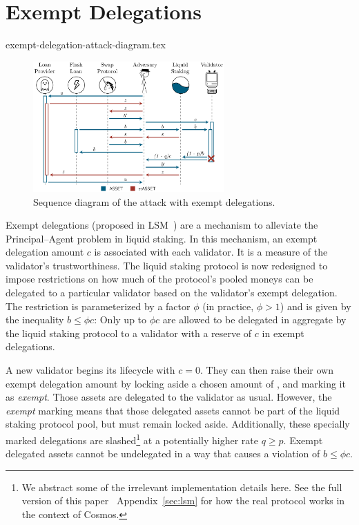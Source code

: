 \section{Exempt Delegations}

\ifccs
  \ifproceedings
  \else
    {exempt-delegation-attack-diagram.tex}
  \fi
\fi

\ifccs
  \begin{figure}[b]
    \centering
    \includegraphics[width=0.65\textwidth]{./figures/sequence-diagram.pdf}
    \caption{Sequence diagram of the attack with exempt delegations.}
    \label{fig:exempt-sequence}
  \end{figure}
\fi

Exempt delegations (proposed in LSM~\cite{liquidity-staking-module})
are a mechanism to alleviate the Principal--Agent problem in liquid staking.
In this mechanism, an exempt delegation amount $c$ \asset is associated
with each validator. It is a measure of the validator's trustworthiness.
The liquid staking protocol is now redesigned to impose restrictions
on how much of the protocol's pooled moneys can be delegated to a particular
validator based on the validator's exempt delegation.
The restriction is
parameterized by a factor $\phi$ (in practice, $\phi > 1$)
and is given by the inequality $b \leq \phi c$: Only up to $\phi c$ \assets
are allowed to be delegated in aggregate by the liquid staking protocol
to a validator with a reserve of $c$ \asset in exempt delegations.

A new validator begins its lifecycle with $c = 0$. They can then
raise their own exempt delegation amount by locking aside a
chosen amount of \asset, and marking it as \emph{exempt}. Those
assets are delegated to the validator as usual. However,
the \emph{exempt}
marking means that those delegated assets cannot be part of the liquid
staking protocol pool, but must remain locked aside. Additionally,
these specially marked delegations are slashed\footnote{We abstract some
of the irrelevant implementation details here. See
\ifproceedings
  the full version of this paper~\cite{liquid-staking-eprint}
\else
  Appendix~\ref{sec:lsm}
\fi
for how the real protocol works in the context of Cosmos.}
at a potentially higher rate $q \geq p$. Exempt delegated assets cannot
be undelegated in a way that causes a violation of $b \leq \phi c$.

